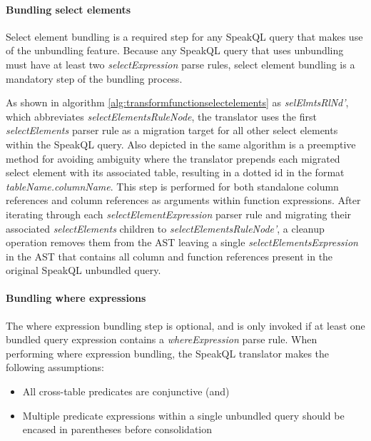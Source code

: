 \paragraph{Bundling select elements}

Select element bundling is a required step for any SpeakQL query that makes use of the unbundling feature. Because any SpeakQL query that uses unbundling must have at least two \emph{selectExpression} parse rules, select element bundling is a mandatory step of the bundling process.

\TransformFunctionSelectElements

As shown in algorithm \ref{alg:transformfunctionselectelements} as \emph{selElmtsRlNd'}, which abbreviates \emph{selectElementsRuleNode}, the translator uses the first \emph{selectElements} parser rule as a migration target for all other select elements within the SpeakQL query. Also depicted in the same algorithm is a preemptive method for avoiding ambiguity where the translator prepends each migrated select element with its associated table, resulting in a dotted id in the format \emph{tableName.columnName}. This step is performed for both standalone column references and column references as arguments within function expressions. After iterating through each \emph{selectElementExpression} parser rule and migrating their associated \emph{selectElements} children to \emph{selectElementsRuleNode'}, a cleanup operation removes them from the AST leaving a single \emph{selectElementsExpression} in the AST that contains all column and function references present in the original SpeakQL unbundled query.

\paragraph{Bundling where expressions}

The where expression bundling step is optional, and is only invoked if at least one bundled query expression contains a \emph{whereExpression} parse rule. When performing where expression bundling, the SpeakQL translator makes the following assumptions:

\begin{itemize}
  \item All cross-table predicates are conjunctive (and)
  \item Multiple predicate expressions within a single unbundled query should be encased in parentheses before consolidation
\end{itemize}


